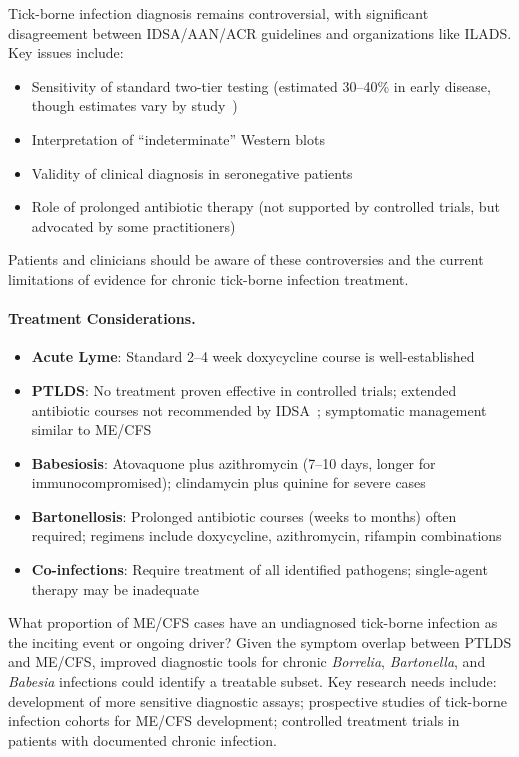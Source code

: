 \begin{warning}
Tick-borne infection diagnosis remains controversial, with significant disagreement between IDSA/AAN/ACR guidelines and organizations like ILADS. Key issues include:
\begin{itemize}
    \item Sensitivity of standard two-tier testing (estimated 30--40\% in early disease, though estimates vary by study~\cite{Steere2016postLyme})
    \item Interpretation of ``indeterminate'' Western blots
    \item Validity of clinical diagnosis in seronegative patients
    \item Role of prolonged antibiotic therapy (not supported by controlled trials, but advocated by some practitioners)
\end{itemize}
Patients and clinicians should be aware of these controversies and the current limitations of evidence for chronic tick-borne infection treatment.
\end{warning}

\paragraph{Treatment Considerations.}
\begin{itemize}
    \item \textbf{Acute Lyme}: Standard 2--4 week doxycycline course is well-established
    \item \textbf{PTLDS}: No treatment proven effective in controlled trials; extended antibiotic courses not recommended by IDSA~\cite{IDSALyme2020}; symptomatic management similar to ME/CFS
    \item \textbf{Babesiosis}: Atovaquone plus azithromycin (7--10 days, longer for immunocompromised); clindamycin plus quinine for severe cases
    \item \textbf{Bartonellosis}: Prolonged antibiotic courses (weeks to months) often required; regimens include doxycycline, azithromycin, rifampin combinations
    \item \textbf{Co-infections}: Require treatment of all identified pathogens; single-agent therapy may be inadequate
\end{itemize}

\begin{open_question}
What proportion of ME/CFS cases have an undiagnosed tick-borne infection as the inciting event or ongoing driver? Given the symptom overlap between PTLDS and ME/CFS, improved diagnostic tools for chronic \emph{Borrelia}, \emph{Bartonella}, and \emph{Babesia} infections could identify a treatable subset. Key research needs include: development of more sensitive diagnostic assays; prospective studies of tick-borne infection cohorts for ME/CFS development; controlled treatment trials in patients with documented chronic infection.
\end{open_question}

